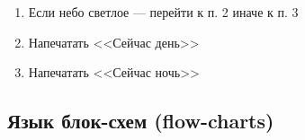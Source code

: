 {{        \vspace{0.5cm}
        \begin{enumerate}
          \item Если небо светлое --- перейти к п. 2 иначе к п. 3
          \item Напечатать <<Сейчас день>>
          \item Напечатать <<Сейчас ночь>>
        \end{enumerate}
      }

    \subsection{Язык блок-схем (flow-charts)}

      \newcommand{\algtree} {
        \node (dec1) [decision] {Плохая оценка};
        \node [left of=dec1, node distance=2.3cm] {Да};
        \node [right of=dec1, node distance=2.3cm] {Нет};

        \node (pro1) [process, below of=dec1, left of=dec1, node distance=2cm] {Задать красный цвет вывода};
        \node (io1) [io, below of=pro1, right of=pro1, node distance=2cm] {Оценка};
        \draw [arrow] (dec1) -| (pro1);
      }

}
